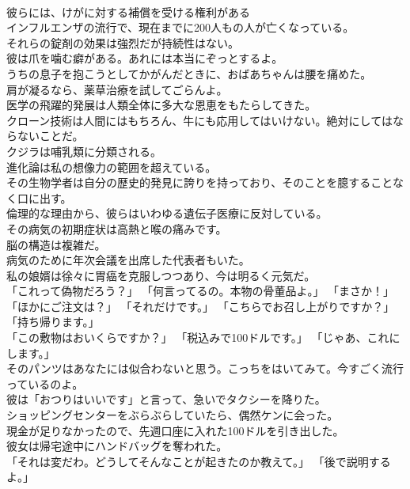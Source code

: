 \documentclass[8pt]{extreport}
\begin{document}
\begin{CJK}{UTF8}{min}
\\	彼らには、けがに対する補償を受ける権利がある	
\\	インフルエンザの流行で、現在までに200人もの人が亡くなっている。	
\\	それらの錠剤の効果は強烈だが持続性はない。	
\\	彼は爪を噛む癖がある。あれには本当にぞっとするよ。	
\\	うちの息子を抱こうとしてかがんだときに、おばあちゃんは腰を痛めた。	
\\	肩が凝るなら、薬草治療を試してごらんよ。	
\\	医学の飛躍的発展は人類全体に多大な恩恵をもたらしてきた。	
\\	クローン技術は人間にはもちろん、牛にも応用してはいけない。絶対にしてはならないことだ。	
\\	クジラは哺乳類に分類される。	
\\	進化論は私の想像力の範囲を超えている。	
\\	その生物学者は自分の歴史的発見に誇りを持っており、そのことを臆することなく口に出す。	
\\	倫理的な理由から、彼らはいわゆる遺伝子医療に反対している。	
\\	その病気の初期症状は高熱と喉の痛みです。	
\\	脳の構造は複雑だ。	
\\	病気のために年次会議を出席した代表者もいた。	
\\	私の娘婿は徐々に胃癌を克服しつつあり、今は明るく元気だ。	
\\	「これって偽物だろう？」 「何言ってるの。本物の骨董品よ。」 「まさか！」	
\\	「ほかにご注文は？」 「それだけです。」 「こちらでお召し上がりですか？」 「持ち帰ります。」	
\\	「この敷物はおいくらですか？」 「税込みで100ドルです。」 「じゃあ、これにします。」	
\\	そのパンツはあなたには似合わないと思う。こっちをはいてみて。今すごく流行っているのよ。	
\\	彼は「おつりはいいです」と言って、急いでタクシーを降りた。	
\\	ショッピングセンターをぶらぶらしていたら、偶然ケンに会った。	
\\	現金が足りなかったので、先週口座に入れた100ドルを引き出した。	
\\	彼女は帰宅途中にハンドバッグを奪われた。	
\\	「それは変だわ。どうしてそんなことが起きたのか教えて。」 「後で説明するよ。」	

\end{CJK}
\end{document}
